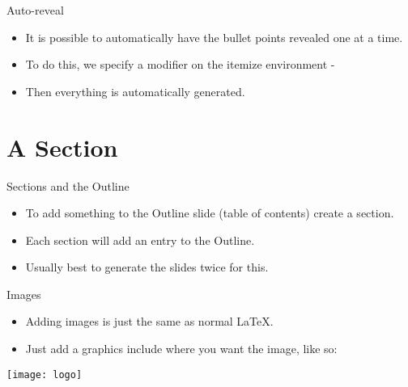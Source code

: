 \documentclass{beamer} %
\begin{document}
    \begin{frame}{Auto-reveal}
        \begin{itemize}[<+->]
            \item It is possible to automatically have the bullet points revealed one at a time.
            \item To do this, we specify a modifier on the itemize environment - \[<+->\]
            \item Then everything is automatically generated.
        \end{itemize}
    \end{frame}
    
    \section{A Section}
    
    \begin{frame}{Sections and the Outline}
        \begin{itemize}
            \item To add something to the Outline slide (table of contents) create a section.
            \item Each section will add an entry to the Outline.
            \item Usually best to generate the slides twice for this.
        \end{itemize}
    \end{frame}
    
    \begin{frame}{Images}
        \begin{itemize}
            \item Adding images is just the same as normal LaTeX.
            \item Just add a graphics include where you want the image, like so:
        \end{itemize}
        \texttt{[image: logo]}
    \end{frame}
    
\end{document}
